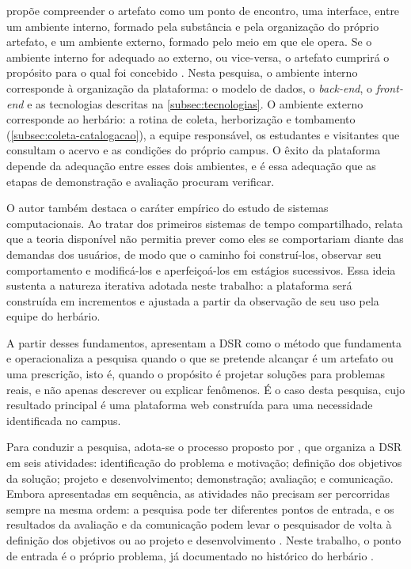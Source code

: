 \documentclass[
    12pt,        %
    openany,     %
    oneside,     %
    a4paper,     %
    english,     %
    french,      %
    spanish,     %
    brazil,      %
    article      %
]{abntex2}
\begin{document}
 propõe compreender o artefato como um ponto de encontro, uma interface, entre um ambiente interno, formado pela substância e pela organização do próprio artefato, e um ambiente externo, formado pelo meio em que ele opera. Se o ambiente interno for adequado ao externo, ou vice-versa, o artefato cumprirá o propósito para o qual foi concebido \cite{simon1996}. Nesta pesquisa, o ambiente interno corresponde à organização da plataforma: o modelo de dados, o \textit{back-end}, o \textit{front-end} e as tecnologias descritas na \autoref{subsec:tecnologias}. O ambiente externo corresponde ao herbário: a rotina de coleta, herborização e tombamento (\autoref{subsec:coleta-catalogacao}), a equipe responsável, os estudantes e visitantes que consultam o acervo e as condições do próprio campus. O êxito da plataforma depende da adequação entre esses dois ambientes, e é essa adequação que as etapas de demonstração e avaliação procuram verificar.

O autor também destaca o caráter empírico do estudo de sistemas computacionais. Ao tratar dos primeiros sistemas de tempo compartilhado,  relata que a teoria disponível não permitia prever como eles se comportariam diante das demandas dos usuários, de modo que o caminho foi construí-los, observar seu comportamento e modificá-los e aperfeiçoá-los em estágios sucessivos. Essa ideia sustenta a natureza iterativa adotada neste trabalho: a plataforma será construída em incrementos e ajustada a partir da observação de seu uso pela equipe do herbário.

A partir desses fundamentos,  apresentam a DSR como o método que fundamenta e operacionaliza a pesquisa quando o que se pretende alcançar é um artefato ou uma prescrição, isto é, quando o propósito é projetar soluções para problemas reais, e não apenas descrever ou explicar fenômenos. É o caso desta pesquisa, cujo resultado principal é uma plataforma web construída para uma necessidade identificada no campus.

Para conduzir a pesquisa, adota-se o processo proposto por , que organiza a DSR em seis atividades: identificação do problema e motivação; definição dos objetivos da solução; projeto e desenvolvimento; demonstração; avaliação; e comunicação. Embora apresentadas em sequência, as atividades não precisam ser percorridas sempre na mesma ordem: a pesquisa pode ter diferentes pontos de entrada, e os resultados da avaliação e da comunicação podem levar o pesquisador de volta à definição dos objetivos ou ao projeto e desenvolvimento \cite{peffers2007dsrm}. Neste trabalho, o ponto de entrada é o próprio problema, já documentado no histórico do herbário \cite{lopes2023herbario}.
\end{document}
